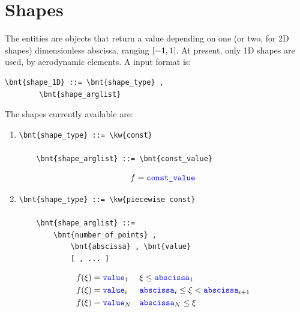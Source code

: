\section{Shapes}
\label{sec:Shape}
The  entities are objects that return a value depending on one
(or two, for 2D shapes) dimensionless abscissa, ranging $ \left[ -1,1 \right] $.
At present, only 1D shapes are used, by aerodynamic elements.
A  input format is:
\begin{Verbatim}[commandchars=\\\{\}]
    \bnt{shape_1D} ::= \bnt{shape_type} ,
        \bnt{shape_arglist}
\end{Verbatim}
The shapes currently available are:
\begin{enumerate}
    \item {}
\begin{Verbatim}[commandchars=\\\{\}]
    \bnt{shape_type} ::= \kw{const}

    \bnt{shape_arglist} ::= \bnt{const_value}
\end{Verbatim}
\begin{align}
	f = \textcolor{blue}{\texttt{const\_value}}
\end{align}

    \item {}
\begin{Verbatim}[commandchars=\\\{\}]
    \bnt{shape_type} ::= \kw{piecewise const}

    \bnt{shape_arglist} ::=
        \bnt{number_of_points} , 
            \bnt{abscissa} , \bnt{value}
            [ , ... ]
\end{Verbatim}
\begin{subequations}
\begin{align}
	f(\xi) &= \textcolor{blue}{\texttt{value}}_1	&& \xi \le \textcolor{blue}{\texttt{abscissa}}_1
	\\
	f(\xi) &= \textcolor{blue}{\texttt{value}}_i	&& \textcolor{blue}{\texttt{abscissa}}_i \le \xi < \textcolor{blue}{\texttt{abscissa}}_{i+1}
	\\
	f(\xi) &= \textcolor{blue}{\texttt{value}}_N	&& \textcolor{blue}{\texttt{abscissa}}_N \le \xi
\end{align}
\end{subequations}


\end{enumerate}
